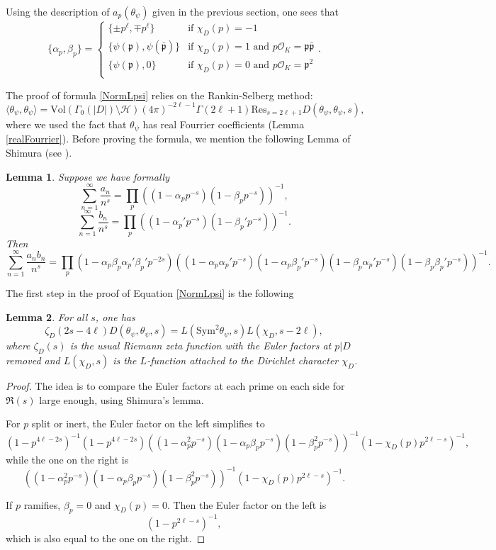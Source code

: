 \documentclass[twoside,10pt]{article}
\newtheorem{lemma}{Lemma}
\newcommand{\Res}{\textrm{Res}}
\renewcommand{\H}{\mathcal{H}}
\newcommand{\p}{\mathfrak{p}}
\renewcommand{\O}{\mathcal{O}}
\newcommand{\tpsi}{\theta_\psi}
\begin{document}
Using the description of $a_p(\tpsi)$ given in the previous section, one sees that
\[\{\alpha_p,\beta_p\}=\begin{cases}
	\{\pm p^\ell,\mp p^\ell\}	&\text{if } \chi_D(p)=-1\\
	\{\psi(\p),\psi(\bar{\p})\}&\text{if } \chi_D(p)=1 \text{ and }p\O_K=\p\bar{\p}\\
	\{\psi(\p),0\}&\text{if }  \chi_D(p)=0 \text{ and }p\O_K=\p^2\\
\end{cases}.\]

The proof of formula \ref{NormLpsi} relies on the Rankin-Selberg method:
\[\langle\tpsi,\tpsi\rangle=\text{Vol}(\Gamma_0(|D|)\setminus\H)(4\pi)^{-2\ell-1}\Gamma(2\ell+1)\Res_{s=2\ell+1}D(\tpsi,\tpsi,s),\]
where we used the fact that $\tpsi$ has real Fourrier coefficients (Lemma \ref{realFourrier}). Before proving the formula, we mention the following Lemma of Shimura (see \cite[Ch.3, Lem.1]{Shi3}).

\begin{lemma}
	Suppose we have formally
	\[\sum_{n=1}^\infty\frac{a_n}{n^s}=\prod_{p}((1-\alpha_pp^{-s})(1-\beta_pp^{-s}))^{-1},\]
	\[\sum_{n=1}^\infty\frac{b_n}{n^s}=\prod_{p}((1-\alpha_p'p^{-s})(1-\beta_p'p^{-s}))^{-1}.\]
	Then
	\[\sum_{n=1}^\infty\frac{a_nb_n}{n^s}=\prod_{p}(1-\alpha_p\beta_p\alpha_p'\beta_p'p^{-2s})((1-\alpha_p\alpha_p'p^{-s})(1-\alpha_p\beta_p'p^{-s})(1-\beta_p\alpha_p'p^{-s})(1-\beta_p\beta_p'p^{-s}))^{-1}.\]
\end{lemma}

The first step in the proof of Equation \ref{NormLpsi} is the following

\begin{lemma}
	For all $s$, one has
	\[\zeta_D(2s-4\ell)D(\tpsi,\tpsi,s)=L(\textrm{Sym}^2\tpsi,s)L(\chi_D,s-2\ell),\]
	where $\zeta_D(s)$ is the usual Riemann zeta function with the Euler factors at $p|D$ removed and $L(\chi_D,s)$ is the $L$-function attached to the Dirichlet character $\chi_D$.
\end{lemma}
\begin{proof}
	The idea is to compare the Euler factors at each prime on each side for $\Re(s)$ large enough, using Shimura's lemma.
	
	For $p$ split or inert, the Euler factor on the left simplifies to
	\[(1-p^{4\ell-2s})^{-1}(1-p^{4\ell-2s})((1-\alpha_p^2p^{-s})(1-\alpha_p\beta_pp^{-s})(1-\beta_p^2p^{-s}))^{-1}(1-\chi_D(p)p^{2\ell-s})^{-1},\]
	while the one on the right is
	\[((1-\alpha_p^2p^{-s})(1-\alpha_p\beta_pp^{-s})(1-\beta_p^2p^{-s}))^{-1}(1-\chi_D(p)p^{2\ell-s})^{-1}.\]
	
	If $p$ ramifies, $\beta_p=0$ and $\chi_D(p)=0$. Then the Euler factor on the left is
	\[(1-p^{2\ell-s})^{-1},\]
	which is also equal to the one on the right.	
\end{proof}
\end{document}
